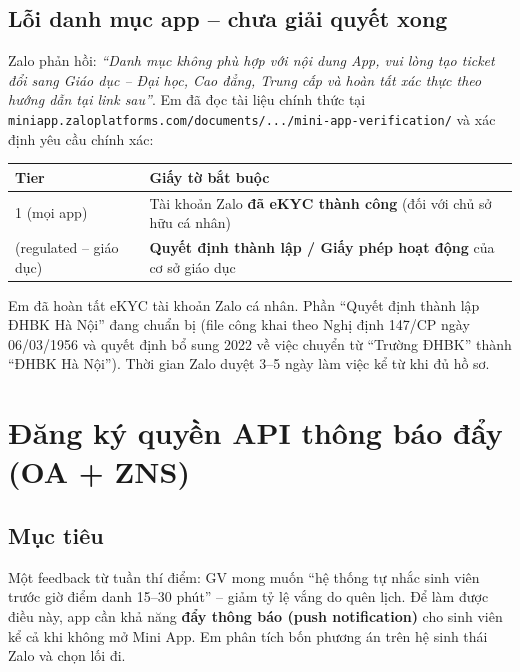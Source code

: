 \documentclass{article}
\begin{document}
\subsection{Lỗi danh mục app -- chưa giải quyết xong}

Zalo phản hồi: \textit{``Danh mục không phù hợp với nội dung App, vui lòng tạo ticket đổi sang Giáo dục -- Đại học, Cao đẳng, Trung cấp và hoàn tất xác thực theo hướng dẫn tại link sau''}. Em đã đọc tài liệu chính thức tại \texttt{miniapp.zaloplatforms.com/documents/.../mini-app-verification/} và xác định yêu cầu chính xác:

\begin{center}
\begin{tabularx}{\textwidth}{@{}l X@{}}
\toprule
\textbf{Tier} & \textbf{Giấy tờ bắt buộc} \\
\midrule
1 (mọi app) & Tài khoản Zalo \textbf{đã eKYC thành công} (đối với chủ sở hữu cá nhân) \\
\addlinespace
2 (regulated -- giáo dục) & \textbf{Quyết định thành lập / Giấy phép hoạt động} của cơ sở giáo dục \\
\bottomrule
\end{tabularx}
\end{center}

Em đã hoàn tất eKYC tài khoản Zalo cá nhân. Phần ``Quyết định thành lập ĐHBK Hà Nội'' đang chuẩn bị (file công khai theo Nghị định 147/CP ngày 06/03/1956 và quyết định bổ sung 2022 về việc chuyển từ ``Trường ĐHBK'' thành ``ĐHBK Hà Nội''). Thời gian Zalo duyệt 3--5 ngày làm việc kể từ khi đủ hồ sơ.

\section{Đăng ký quyền API thông báo đẩy (OA + ZNS)}

\subsection{Mục tiêu}

Một feedback từ tuần thí điểm: GV mong muốn ``hệ thống tự nhắc sinh viên trước giờ điểm danh 15--30 phút'' -- giảm tỷ lệ vắng do quên lịch. Để làm được điều này, app cần khả năng \textbf{đẩy thông báo (push notification)} cho sinh viên kể cả khi không mở Mini App. Em phân tích bốn phương án trên hệ sinh thái Zalo và chọn lối đi.
\end{document}
